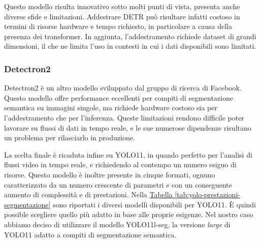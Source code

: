 \documentclass[12pt]{report}
\begin{document}
Questo modello risulta innovativo sotto molti punti di vista, presenta anche diverse sfide e limitazioni. Addestrare DETR può risultare infatti costoso in termini di risorse hardware e tempo richiesto, in particolare a causa della presenza dei transformer. In aggiunta, l'addestramento richiede dataset di grandi dimensioni, il che ne limita l'uso in contesti in cui i dati disponibili sono limitati.

\subsubsection{Detectron2}
\label{sec:detectron}

Detectron2 è un altro modello sviluppato dal gruppo di ricerca di Facebook. Questo modello offre performance eccellenti per compiti di segmentazione semantica su immagini singole, ma richiede hardware costoso sia per l'addestramento che per l'inferenza. Queste limitazioni rendono difficile poter lavorare su flussi di dati in tempo reale, e le sue numerose dipendenze risultano un problema per rilasciarlo in produzione.

\vspace{10pt}

La scelta finale è ricaduta infine su YOLO11, in quando perfetto per l'analisi di flussi video in tempo reale, e richiedendo al contempo un numero esiguo di risorse. Questo modello è inoltre presente in cinque formati, ognuno caratterizzato da un numero crescente di parametri e con un conseguente aumento di complessità e di prestazioni. Nella \hyperref[tab:yolo-prestazioni-segmentazione]{Tabella \ref{tab:yolo-prestazioni-segmentazione}} sono riportati i diversi modelli disponibili per YOLO11. È quindi possible scegliere quello più adatto in base alle proprie esigenze. Nel nostro caso abbiamo deciso di utilizzare il modello YOLO11l-seg, la versione \textit{large} di YOLO11 adatto a compiti di segmentazione semantica.
\end{document}
